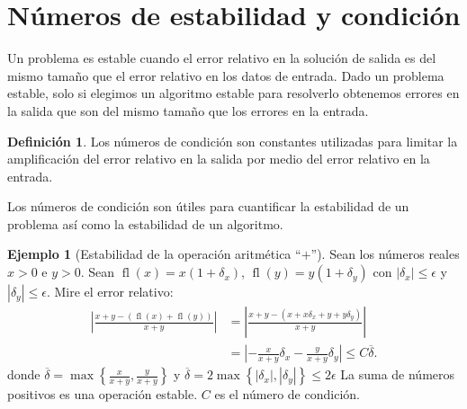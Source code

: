 \documentclass[a4paper,10pt]{scrartcl}
\theoremstyle{definition}
\newtheorem{definition}{Definición}
\newtheorem{example}{Ejemplo}
\begin{document}
\section{Números de estabilidad y condición}

Un problema es estable cuando el error relativo en la solución de
salida es del mismo tamaño que el error relativo en los datos de
entrada.
Dado un problema estable, solo si elegimos un algoritmo estable para
resolverlo obtenemos errores en la salida que son del mismo tamaño
que los errores en la entrada.

\begin{definition}
    Los números de condición son constantes utilizadas para limitar
    la amplificación del error relativo en la salida por medio del
    error relativo en la entrada.
\end{definition}

Los números de condición son útiles para cuantificar la estabilidad
de un problema así como la estabilidad de un algoritmo.

\begin{example}[Estabilidad de la operación aritmética ``$+$'']
    Sean los números reales $x>0$ e $y>0$.
    Sean
    \begin{math}
        \operatorname{fl}
        \left(x\right)=
        x\left(1+\delta_{x}\right)
    \end{math},
    \begin{math}
        \operatorname{fl}
        \left(y\right)=
        y\left(1+\delta_{y}\right)
    \end{math}
    con
    \begin{math}
        \left|\delta_{x}\right|\leq
        \epsilon
    \end{math}
    y
    \begin{math}
        \left|\delta_{y}\right|\leq
        \epsilon
    \end{math}.
    Mire el error relativo:
    \begin{align*}
        \left|
        \frac{
            x+y-
            \left(
            \operatorname{fl}
            \left(x\right)+
            \operatorname{fl}
            \left(y\right)
            \right)
        }{x+y}
        \right| & =
        \left|
        \frac{
            x+y-
            \left(
            x+x\delta_{x}+y+y\delta_{y}
            \right)
        }{x+y}
        \right|     \\
                & =
        \left|
        -\frac{x}{x+y}\delta_{x}-
        \frac{y}{x+y}\delta_{y}
        \right|\leq
        C\overline{\delta}.
    \end{align*}
    donde
    \begin{math}
        \overline{\delta}=
        \max
        \left\{
        \frac{x}{x+y},\frac{y}{x+y}
        \right\}
    \end{math}
    y
    \begin{math}
        \overline{\delta}=
        2\max
        \left\{
        \left|\delta_{x}\right|,
        \left|\delta_{y}\right|
        \right\}\leq
        2\epsilon
    \end{math}
    La suma de números positivos es una operación estable.
    $C$ es el número de condición.
\end{example}
\end{document}
